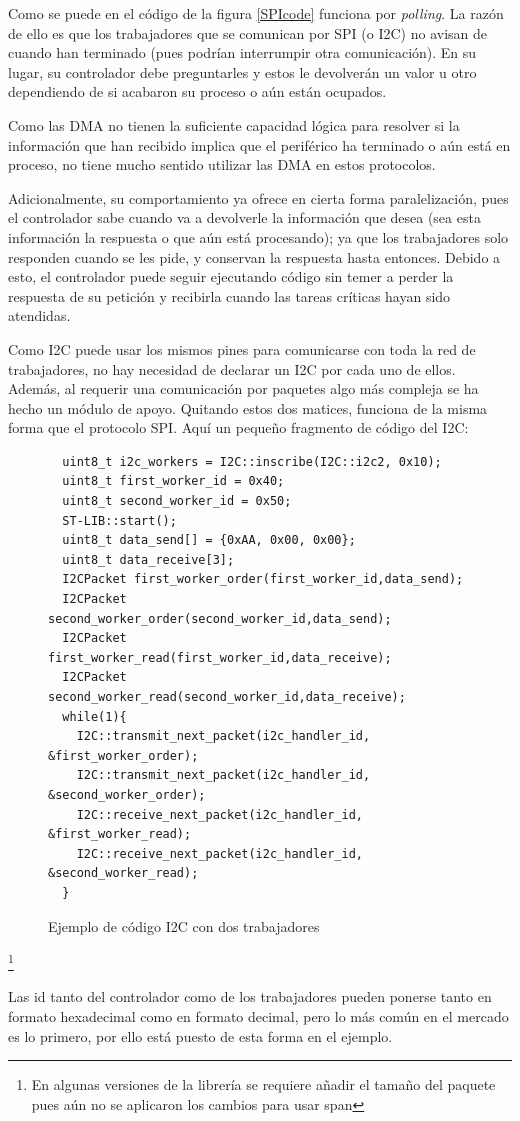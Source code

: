 \documentclass{report}
\begin{document}
\par \vspace{0.3cm}
Como se puede en el código de la figura \ref{SPIcode} funciona por \textit{polling}. La razón de ello es que los trabajadores que se comunican por SPI (o I2C) no avisan de cuando han terminado (pues podrían interrumpir otra comunicación). En su lugar, su controlador debe preguntarles y estos le devolverán un valor u otro dependiendo de si acabaron su proceso o aún están ocupados. \par
Como las DMA no tienen la suficiente capacidad lógica para resolver si la información que han recibido implica que el periférico ha terminado o aún está en proceso, no tiene mucho sentido utilizar las DMA en estos protocolos. \par 
Adicionalmente, su comportamiento ya ofrece en cierta forma paralelización, pues el controlador sabe cuando va a devolverle la información que desea (sea esta información la respuesta o que aún está procesando); ya que los trabajadores solo responden cuando se les pide, y conservan la respuesta hasta entonces. Debido a esto, el controlador puede seguir ejecutando código sin temer a perder la respuesta de su petición y recibirla cuando las tareas críticas hayan sido atendidas. 
\par \vspace{0.3cm}
Como I2C puede usar los mismos pines para comunicarse con toda la red de trabajadores, no hay necesidad de declarar un I2C por cada uno de ellos. Además, al requerir una comunicación por paquetes algo más compleja se ha hecho un módulo de apoyo. Quitando estos dos matices, funciona de la misma forma que el protocolo SPI. Aquí un pequeño fragmento de código del I2C:
\begin{figure}[h]
\begin{lstlisting}
  uint8_t i2c_workers = I2C::inscribe(I2C::i2c2, 0x10);
  uint8_t first_worker_id = 0x40;
  uint8_t second_worker_id = 0x50;
  ST-LIB::start();
  uint8_t data_send[] = {0xAA, 0x00, 0x00}; 
  uint8_t data_receive[3]; 
  I2CPacket first_worker_order(first_worker_id,data_send);
  I2CPacket second_worker_order(second_worker_id,data_send);
  I2CPacket first_worker_read(first_worker_id,data_receive);
  I2CPacket second_worker_read(second_worker_id,data_receive);
  while(1){
    I2C::transmit_next_packet(i2c_handler_id, &first_worker_order);
    I2C::transmit_next_packet(i2c_handler_id, &second_worker_order);
    I2C::receive_next_packet(i2c_handler_id, &first_worker_read);
    I2C::receive_next_packet(i2c_handler_id, &second_worker_read);
  }
\end{lstlisting}
\caption{Ejemplo de código I2C con dos trabajadores}
\label{I2Ccode}
\end{figure}
\footnote{En algunas versiones de la librería se requiere añadir el tamaño del paquete pues aún no se aplicaron los cambios para usar span}
\par \vspace{0.3cm}
Las id tanto del controlador como de los trabajadores pueden ponerse tanto en formato hexadecimal como en formato decimal, pero lo más común en el mercado es lo primero, por ello está puesto de esta forma en el ejemplo. 
\end{document}
